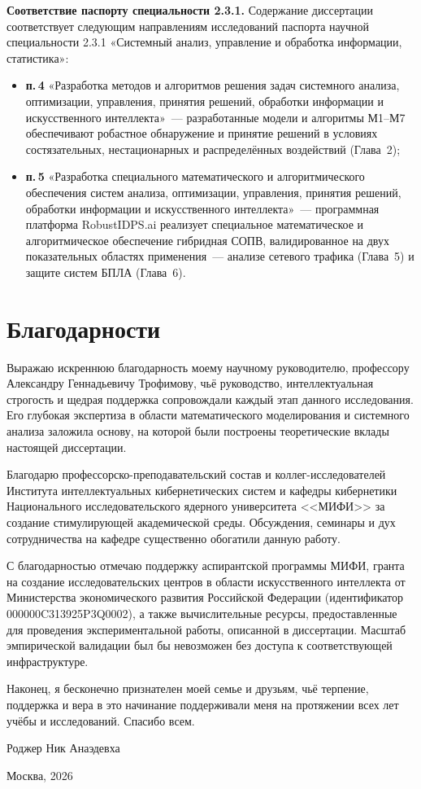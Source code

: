 \medskip
\noindent\textbf{Соответствие паспорту специальности 2.3.1.}
Содержание диссертации соответствует следующим направлениям исследований паспорта научной специальности 2.3.1 «Системный анализ, управление и обработка информации, статистика»:
\begin{itemize}\setlength\itemsep{0.18em}
\item \textbf{п.\,4} «Разработка методов и алгоритмов решения задач системного анализа, оптимизации, управления, принятия решений, обработки информации и искусственного интеллекта»~--- разработанные модели и алгоритмы М1--М7 обеспечивают робастное обнаружение и принятие решений в условиях состязательных, нестационарных и распределённых воздействий (Глава~2);
\item \textbf{п.\,5} «Разработка специального математического и алгоритмического обеспечения систем анализа, оптимизации, управления, принятия решений, обработки информации и искусственного интеллекта»~--- программная платформа \textsf{RobustIDPS.ai} реализует специальное математическое и алгоритмическое обеспечение гибридная СОПВ, валидированное на двух показательных областях применения~--- анализе сетевого трафика (Глава~5) и защите систем БПЛА (Глава~6).
\end{itemize}

\chapter*{Благодарности}

Выражаю искреннюю благодарность моему научному руководителю, профессору Александру Геннадьевичу Трофимову, чьё руководство, интеллектуальная строгость и щедрая поддержка сопровождали каждый этап данного исследования. Его глубокая экспертиза в области математического моделирования и системного анализа заложила основу, на которой были построены теоретические вклады настоящей диссертации.

Благодарю профессорско-преподавательский состав и коллег-исследователей Института интеллектуальных кибернетических систем и кафедры кибернетики Национального исследовательского ядерного университета <<МИФИ>> за создание стимулирующей академической среды. Обсуждения, семинары и дух сотрудничества на кафедре существенно обогатили данную работу.

С благодарностью отмечаю поддержку аспирантской программы МИФИ, гранта на создание исследовательских центров в области искусственного интеллекта от Министерства экономического развития Российской Федерации (идентификатор 000000C313925P3Q0002), а также вычислительные ресурсы, предоставленные для проведения экспериментальной работы, описанной в диссертации. Масштаб эмпирической валидации был бы невозможен без доступа к соответствующей инфраструктуре.

Наконец, я бесконечно признателен моей семье и друзьям, чьё терпение, поддержка и вера в это начинание поддерживали меня на протяжении всех лет учёбы и исследований. Спасибо всем.

\hfill Роджер Ник Анаэдевха

\hfill Москва, 2026 

